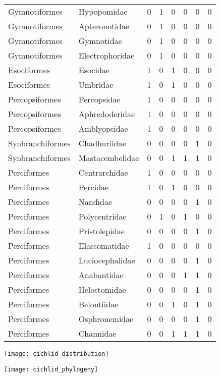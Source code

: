 \documentclass[11pt]{article}
\begin{document}
\begin{longtable}[l]{@{}llrrrrrr@{}}
Gymnotiformes & Hypopomidae & 0 & 1 & 0 & 0 & 0 & 0\tabularnewline
Gymnotiformes & Apteronotidae & 0 & 1 & 0 & 0 & 0 & 0\tabularnewline
Gymnotiformes & Gymnotidae & 0 & 1 & 0 & 0 & 0 & 0\tabularnewline
Gymnotiformes & Electrophoridae & 0 & 1 & 0 & 0 & 0 & 0\tabularnewline
Esociformes & Esocidae & 1 & 0 & 1 & 0 & 0 & 0\tabularnewline
Esociformes & Umbridae & 1 & 0 & 1 & 0 & 0 & 0\tabularnewline
Percopsiformes & Percopsidae & 1 & 0 & 0 & 0 & 0 & 0\tabularnewline
Percopsiformes & Aphredoderidae & 1 & 0 & 0 & 0 & 0 & 0\tabularnewline
Percopsiformes & Amblyopsidae & 1 & 0 & 0 & 0 & 0 & 0\tabularnewline
Synbranchiformes & Chadhuriidae & 0 & 0 & 0 & 0 & 1 & 0\tabularnewline
Synbranchiformes & Mastacembelidae & 0 & 0 & 1 & 1 & 1 &
0\tabularnewline
Perciformes & Centrarchidae & 1 & 0 & 0 & 0 & 0 & 0\tabularnewline
Perciformes & Percidae & 1 & 0 & 1 & 0 & 0 & 0\tabularnewline
Perciformes & Nandidae & 0 & 0 & 0 & 0 & 1 & 0\tabularnewline
Perciformes & Polycentridae & 0 & 1 & 0 & 1 & 0 & 0\tabularnewline
Perciformes & Pristolepidae & 0 & 0 & 0 & 0 & 1 & 0\tabularnewline
Perciformes & Elassomatidae & 1 & 0 & 0 & 0 & 0 & 0\tabularnewline
Perciformes & Luciocephalidae & 0 & 0 & 0 & 0 & 1 & 0\tabularnewline
Perciformes & Anabantidae & 0 & 0 & 0 & 1 & 1 & 0\tabularnewline
Perciformes & Helostomidae & 0 & 0 & 0 & 0 & 1 & 0\tabularnewline
Perciformes & Belontiidae & 0 & 0 & 1 & 0 & 1 & 0\tabularnewline
Perciformes & Osphronemidae & 0 & 0 & 0 & 0 & 1 & 0\tabularnewline
Perciformes & Channidae & 0 & 0 & 1 & 1 & 1 & 0\tabularnewline
\bottomrule
\end{longtable}
\newpage

\restoregeometry
\texttt{[image: cichlid\_distribution]} 

\newpage

\texttt{[image: cichlid\_phylogeny]}
\end{document}
